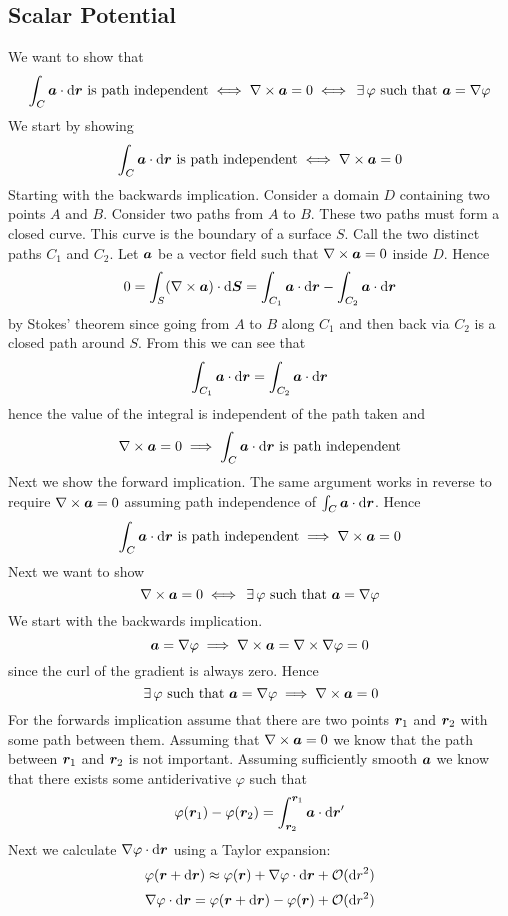 \documentclass{article}
\begin{document}
    \subsection{Scalar Potential}
    We want to show that
    \[\int_C\bm{a}\cdot\dd\bm{r}\text{ is path independent}\iff \nabla\times\bm{a} = 0 \iff \,\exists\, \varphi\text{ such that }\bm{a} = \nabla\varphi\]
    We start by showing
    \[\int_C\bm{a}\cdot\dd\bm{r}\text{ is path independent}\iff \nabla\times\bm{a} = 0\]
    Starting with the backwards implication.
    Consider a domain \(D\) containing two points \(A\) and \(B\).
    Consider two paths from \(A\) to \(B\).
    These two paths must form a closed curve.
    This curve is the boundary of a surface \(S\).
    Call the two distinct paths \(C_1\) and \(C_2\).
    Let \(\bm{a}\) be a vector field such that \(\nabla\times\bm{a} = 0\) inside \(D\).
    Hence
    \[0 = \int_S(\nabla\times\bm{a})\cdot\dd\bm{S} = \int_{C_1}\bm{a}\cdot\dd\bm{r} - \int_{C_2}\bm{a}\cdot\dd\bm{r}\]
    by Stokes' theorem since going from \(A\) to \(B\) along \(C_1\) and then back via \(C_2\) is a closed path around \(S\).
    From this we can see that
    \[\int_{C_1}\bm{a}\cdot\dd\bm{r} = \int_{C_2}\bm{a}\cdot\dd\bm{r}\]
    hence the value of the integral is independent of the path taken and
    \[\nabla\times\bm{a} = 0 \implies \int_C\bm{a}\cdot\dd\bm{r}\text{ is path independent}\]
    Next we show the forward implication.
    The same argument works in reverse to require \(\nabla\times\bm{a} = 0\) assuming path independence of \(\int_C\bm{a}\cdot\dd\bm{r}\).
    Hence
    \[\int_C\bm{a}\cdot\dd\bm{r}\text{ is path independent}\implies\nabla\times\bm{a} = 0\]
    Next we want to show
    \[\nabla\times\bm{a} = 0 \iff \,\exists\, \varphi\text{ such that }\bm{a} = \nabla\varphi\]
    We start with the backwards implication.
    \[\bm{a} = \nabla\varphi \implies \nabla\times\bm{a} = \nabla\times\nabla\varphi = 0\]
    since the curl of the gradient is always zero.
    Hence
    \[\,\exists\,\varphi\text{ such that }\bm{a} = \nabla\varphi \implies \nabla\times\bm{a} = 0\]
    For the forwards implication assume that there are two points \(\bm{r}_1\) and \(\bm{r}_2\) with some path between them.
    Assuming that \(\nabla\times\bm{a} = 0\) we know that the path between \(\bm{r}_1\) and \(\bm{r}_2\) is not important.
    Assuming sufficiently smooth \(\bm{a}\) we know that there exists some antiderivative \(\varphi\) such that
    \[\varphi(\bm{r}_1) - \varphi(\bm{r}_2) = \int_{\bm{r}_2}^{\bm{r}_1}\bm{a}\cdot\dd\bm{r}'\]
    Next we calculate \(\nabla\varphi\cdot\dd\bm{r}\) using a Taylor expansion:
    \[\varphi(\bm{r} + \dd\bm{r}) \approx \varphi(\bm{r}) + \nabla\varphi\cdot\dd\bm{r} + \mathcal{O}(\dd r^2)\]
    \[\nabla\varphi\cdot\dd\bm{r} = \varphi(\bm{r} + \dd\bm{r}) - \varphi(\bm{r}) + \mathcal{O}(\dd r^2)\]
\end{document}
